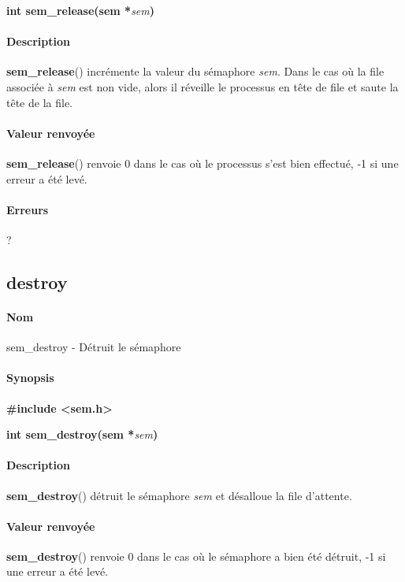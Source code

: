 \documentclass[12pt]{article}
\begin{document}
        \textbf{int sem\_release(sem *}\textit{sem}\textbf{)}
        \paragraph{Description\\}
        \textbf{sem\_release}() incrémente la valeur du sémaphore \textit{sem}. Dans le cas où la file associée à \textit{sem} est non vide, alors il réveille le processus en tête de file et saute la tête de la file.

        \paragraph{Valeur renvoyée\\}
        \textbf{sem\_release}() renvoie 0 dans le cas où le processus s'est bien effectué, -1 si une erreur a été levé.
        \paragraph{Erreurs\\}
        ?
    \newpage
    \subsection{destroy}
        \paragraph{Nom\\}
        sem\_destroy - Détruit le sémaphore
        \paragraph{Synopsis\\}
        \textbf{\#include <sem.h>}

        \textbf{int sem\_destroy(sem *}\textit{sem}\textbf{)}
        \paragraph{Description\\}
        \textbf{sem\_destroy}() détruit le sémaphore \textit{sem} et désalloue la file d'attente.

        \paragraph{Valeur renvoyée\\}
        \textbf{sem\_destroy}() renvoie 0 dans le cas où le sémaphore a bien été détruit, -1 si une erreur a été levé.
\end{document}
